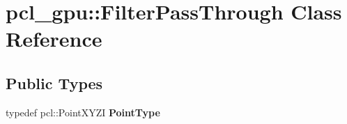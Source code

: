 \hypertarget{classpcl__gpu_1_1FilterPassThrough}{}\section{pcl\+\_\+gpu\+:\+:Filter\+Pass\+Through Class Reference}
\label{classpcl__gpu_1_1FilterPassThrough}
\subsection*{Public Types}
\begin{DoxyCompactItemize}
\item 
\mbox{\label{classpcl__gpu_1_1FilterPassThrough_a7118a1ac020df73303ac36d6a176593d}} 
typedef pcl\+::\+Point\+X\+Y\+ZI {\bfseries Point\+Type}
\end{DoxyCompactItemize}
